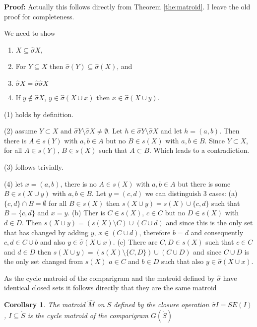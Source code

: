 \documentclass[a4paper,12pt]{article}
\newtheorem{corollary}{Corollary}
\newenvironment{proof}[1][Proof]{\noindent\textbf{#1:} }{}
\begin{document}
\begin{proof}
  Actually this follows directly from Theorem \ref{the:matroid}. I
  leave the old proof for completeness.

  We need to show
  \begin{enumerate}
  \item $X \subseteq \hat{\sigma} X$, 
  \item For $Y \subseteq X$ then $\hat{\sigma}(Y) \subseteq \hat{\sigma}(X)$, and 
  \item $\hat{\sigma} X = \hat{\sigma} \hat{\sigma} X$
  \item If $y \notin \hat{\sigma} X$, $y \in \hat{\sigma}(X \cup x)$ then $x \in
    \hat{\sigma}(X \cup y)$.
  \end{enumerate}
  (1) holds by definition. 

  (2) assume $Y \subset X$ and $\hat{\sigma} Y \setminus \hat{\sigma} X \neq
  \emptyset$. Let $h \in \hat{\sigma} Y \setminus \hat{\sigma} X$ and let $h =
  (a,b)$. Then there is $A \in s(Y)$ with $a,b \in A$ but no $B \in
  s(X)$ with $a,b \in B$. Since $Y \subset X$, for all $A \in s(Y)$,
  $B \in s(X)$ such that $A \subset B$. Which leads to a
  contradiction. 

  (3) follows trivially. 

  (4) let $x = (a,b)$, there is no $A \in s(X)$ with $a,b \in A$ but
  there is some $B \in s(X \cup y)$ with $a,b \in B$. Let $y = (c,d)$
  we can distinguish 3 cases: (a) $\{c,d\} \cap B = \emptyset$ for all
  $B \in s(X)$ then $s(X \cup y) = s(X) \cup \{c,d\}$ such that $B =
  \{c,d\}$ and $x = y$. (b) Ther is $C \in s(X)$, $c \in C$ but
  no $D \in s(X)$ with $d \in D$. Then $s(X \cup y) = (s(X)\setminus C) \cup (C
  \cup d)$ and since this is the only set that has changed by adding
  $y$, $x \in (C\cup d)$, therefore $b = d$ and consequently
  $c,d \in C\cup b$ and also $y \in \hat{\sigma}(X \cup x)$. (c) There are
  $C,D \in s(X)$ such that $c \in C$ and $d \in D$ then $s(X \cup y) =
  (s(X)\setminus \{C,D\})\cup (C \cup D)$ and since $C\cup D$ is the
  only set changed from $s(X)$ $a \in C$ and $b \in D$ such that also
  $y \in \hat{\sigma}(X\cup x)$. 
\end{proof}

As the cycle matroid of the comparigram and the matroid defined by
$\hat{\sigma}$ have identical closed sets it follows directly that
they are the same matroid

\begin{corollary}
  The matroid $\hat{M}$ on $\dot{S}$ defined by the closure operation 
  $\hat{\sigma}I = SE(I)$, $I \subseteq \dot{S}$ is the cycle matroid
  of the comparigram $G(\dot{S})$
\end{corollary}
\end{document}
